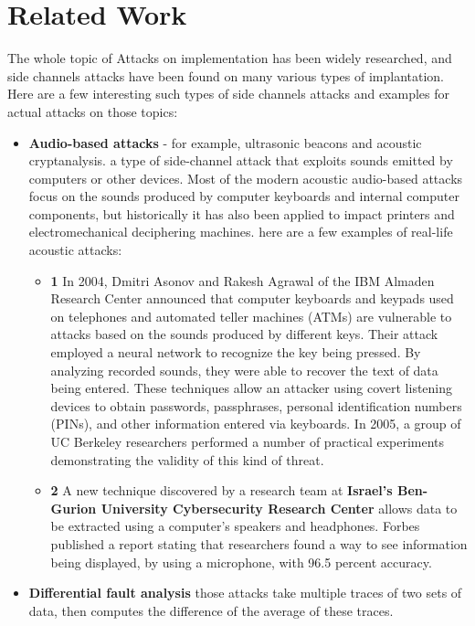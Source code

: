 \section{Related Work} \label{sec:IntroRelatedWork}
The whole topic of Attacks on implementation has been widely researched,
and side channels attacks have been found on many various types of implantation.
Here are a few interesting such types of side channels attacks
 and examples for actual attacks on those topics:
\begin{itemize}
    \item \textbf{Audio-based attacks} - for example, ultrasonic beacons and acoustic cryptanalysis. 
    a type of side-channel attack that exploits sounds emitted by computers or other devices.
    Most of the modern acoustic audio-based attacks focus on the sounds produced by computer keyboards and internal computer components,
    but historically it has also been applied to impact printers and electromechanical deciphering machines.
    here are a few examples of real-life acoustic attacks: 
    \begin{itemize}
        \item \textbf{1} In 2004, Dmitri Asonov and Rakesh Agrawal of the IBM Almaden Research Center announced that computer keyboards and keypads used on telephones and automated teller machines (ATMs) are vulnerable to attacks based on the sounds produced by different keys.
         Their attack employed a neural network to recognize the key being pressed.
         By analyzing recorded sounds, they were able to recover the text of data being entered.
         These techniques allow an attacker using covert listening devices to obtain passwords, passphrases, personal identification numbers (PINs), and other information entered via keyboards.
         In 2005, a group of UC Berkeley researchers performed a number of practical experiments demonstrating the validity of this kind of threat.
        \item \textbf{2} A new technique discovered by a research team at \textbf{Israel's Ben-Gurion University Cybersecurity Research Center} 
        allows data to be extracted using a computer's speakers and headphones. 
        Forbes published a report stating that researchers found a way to see information being displayed, by using a microphone, with 96.5 percent accuracy.
    \end{itemize}
    \item \textbf{Differential fault analysis} those attacks take multiple traces of two sets of data, then computes the difference of the average of these traces.

\end{itemize}
